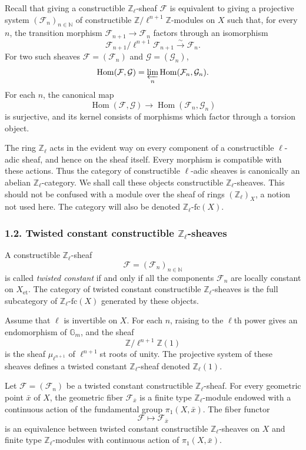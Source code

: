 \documentclass[12pt]{article}
\newcommand{\bZ}{\mathbb Z}
\newcommand{\bN}{\mathbb N}
\newcommand{\cF}{\mathcal F}
\newcommand{\cG}{\mathcal G}
\newcommand{\Hom}{\operatorname{Hom}}
\newcommand{\fc}{\mathrm{fc}}
\begin{document}
Recall that giving a constructible $\bZ_\ell$-sheaf $\cF$ is equivalent to giving a
projective system $(\cF_n)_{n\in\bN}$ of constructible
$\bZ/\ell^{n+1}\bZ$-modules on $X$ such that, for every $n$, the transition morphism
$\cF_{n+1}\to\cF_n$ factors through an isomorphism
\[
       \cF_{n+1}/\ell^{n+1}\cF_{n+1}\xrightarrow{\sim}\cF_n.
\]
For two such sheaves $\cF=(\cF_n)$ and $\cG=(\cG_n)$,
\[
       \Hom(\cF,\cG)=\varprojlim_n\Hom(\cF_n,\cG_n).
\]
For each $n$, the canonical map
\[
       \Hom(\cF,\cG)\longrightarrow\Hom(\cF_n,\cG_n)
\]
is surjective, and its kernel consists of morphisms which factor through a torsion
object.

The ring $\bZ_\ell$ acts in the evident way on every component of a constructible
$\ell$-adic sheaf, and hence on the sheaf itself. Every morphism is compatible with
these actions. Thus the category of constructible $\ell$-adic sheaves is canonically
an abelian $\bZ_\ell$-category. We shall call these objects constructible
$\bZ_\ell$-sheaves. This should not be confused with a module over the sheaf of
rings $(\bZ_\ell)_X$, a notion not used here. The category will also be denoted
$\bZ_\ell\text{-}\fc(X)$.

\subsubsection*{1.2. Twisted constant constructible $\bZ_\ell$-sheaves}

A constructible $\bZ_\ell$-sheaf
\[
       \cF=(\cF_n)_{n\in\bN}
\]
is called \emph{twisted constant} if and only if all the components $\cF_n$ are
locally constant on $X_{\mathrm{et}}$. The category of twisted constant constructible
$\bZ_\ell$-sheaves is the full subcategory of $\bZ_\ell\text{-}\fc(X)$ generated by
these objects.

Assume that $\ell$ is invertible on $X$. For each $n$, raising to the $\ell$th power
gives an endomorphism of $\mathbb G_m$, and the sheaf
\[
       \bZ/\ell^{n+1}\bZ(1)
\]
is the sheaf $\mu_{\ell^{n+1}}$ of $\ell^{n+1}$st roots of unity. The projective
system of these sheaves defines a twisted constant $\bZ_\ell$-sheaf denoted
$\bZ_\ell(1)$.

Let $\cF=(\cF_n)$ be a twisted constant constructible $\bZ_\ell$-sheaf. For every
geometric point $\bar x$ of $X$, the geometric fiber $\cF_{\bar x}$ is a finite type
$\bZ_\ell$-module endowed with a continuous action of the fundamental group
$\pi_1(X,\bar x)$. The fiber functor
\[
       \cF\longmapsto\cF_{\bar x}
\]
is an equivalence between twisted constant constructible $\bZ_\ell$-sheaves on $X$
and finite type $\bZ_\ell$-modules with continuous action of $\pi_1(X,\bar x)$.
\end{document}
